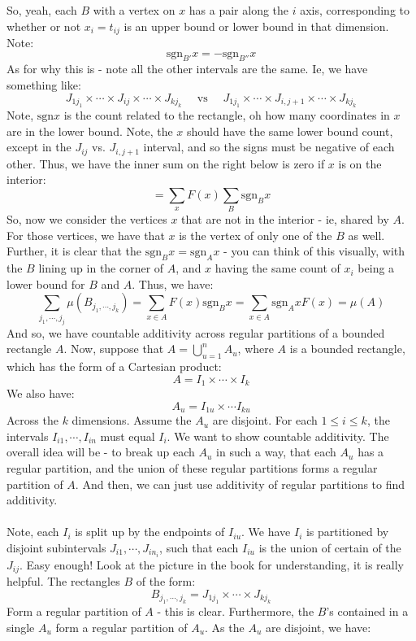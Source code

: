 \documentclass[12pt,a4paper]{article}
\newcommand{\1}[1]{\mathbbm{1}\left\{ #1 \right\}}
\newcommand{\sgn}{\text{sgn}}
\begin{document}
So, yeah, each $B$ with a vertex on $x$ has a pair along the $i$ axis, corresponding to whether or not $x_i = t_{ij}$ is an upper bound or lower bound in that dimension. Note:
$$
	\sgn_{B'} x = - \sgn_{B''} x
$$
As for why this is - note all the other intervals are the same. Ie, we have something like:
$$
	J_{1j_1} \times \cdots \times J_{ij} \times \cdots \times J_{kj_k} \quad\text{ vs }\quad
	J_{1j_1} \times \cdots \times J_{i,j+1} \times \cdots \times J_{kj_k}
$$
Note, $\sgn x$ is the count related to the rectangle, oh how many coordinates in $x$ are in the lower bound. Note, the $x$ should have the same lower bound count, except in the $J_{ij}$ vs. $J_{i,j+1}$ interval, and so the signs must be negative of each other. Thus, we have the inner sum on the right below is zero if $x$ is on the interior:
$$
	= \sum_x F(x) \sum_{B} \sgn_B x
$$
So, now we consider the vertices $x$ that are not in the interior - ie, shared by $A$. For those vertices, we have that $x$ is the vertex of only one of the $B$ as well. Further, it is clear that the $\sgn_B x = \sgn_A x$ - you can think of this visually, with the $B$ lining up in the corner of $A$, and $x$ having the same count of $x_i$ being a lower bound for $B$ and $A$. Thus, we have:
$$
	\sum_{j_1,\cdots,j_j} \mu(B_{j_1,\cdots,j_k}) = 
	\sum_{x \in A} F(x) \sgn_B x =
	\sum_{x \in A} \sgn_A x F(x) = \mu(A)
$$
And so, we have countable additivity across regular partitions of a bounded rectangle $A$. Now, suppose that $A = \bigcup_{u=1}^n A_u$, where $A$ is a bounded rectangle, which has the form of a Cartesian product:
$$
	A = I_1 \times \cdots \times I_k
$$
We also have:
$$
	A_u = I_{1u} \times \cdots I_{ku}
$$
Across the $k$ dimensions. Assume the $A_u$ are disjoint. For each $1 \leq i \leq k$, the intervals $I_{i1}, \cdots, I_{in}$ must equal $I_i$. We want to show countable additivity. The overall idea will be - to break up each $A_u$ in such a way, that each $A_u$ has a regular partition, and the union of these regular partitions forms a regular partition of $A$. And then, we can just use additivity of regular partitions to find additivity.
\\\\
Note, each $I_i$ is split up by the endpoints of $I_{iu}$. We have $I_i$ is partitioned by disjoint subintervals $J_{i1}, \cdots, J_{in_i}$, such that each $I_{iu}$ is the union of certain of the $J_{ij}$. Easy enough! Look at the picture in the book for understanding, it is really helpful. The rectangles $B$ of the form:
$$
	B_{j_1,\cdots,j_k} = J_{1j_1} \times \cdots \times J_{kj_k}
$$
Form a regular partition of $A$ - this is clear. Furthermore, the $B$'s contained in a single $A_u$ form a regular partition of $A_u$. As the $A_u$ are disjoint, we have:
\end{document}
